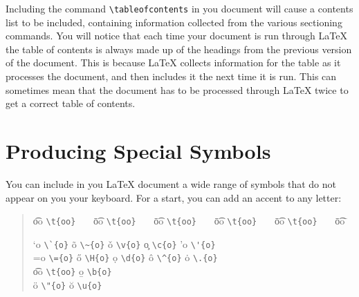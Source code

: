 Including the command \verb|\tableofcontents| in you document will cause a
contents list to be included, containing information collected from the various
sectioning commands.  You will notice that each time your document is run
through \LaTeX{} the table of contents is always made up of the headings from
the previous version of the document.  This is because \LaTeX{} collects
information for the table as it processes the document, and then includes it
the next time it is run.  This can sometimes mean that the document has to be
processed through \LaTeX{} twice to get a correct table of contents.

\section{Producing Special Symbols}

You can include in you \LaTeX{} document a wide range of symbols that do not
appear on you your keyboard. For a start, you can add an accent to any letter:
\begin{quote}\begin{tabbing}

\t{oo} \= \verb|\t{oo}|~~~ \=
\t{oo} \= \verb|\t{oo}|~~~ \=
\t{oo} \= \verb|\t{oo}|~~~ \=
\t{oo} \= \verb|\t{oo}|~~~ \=
\t{oo} \= \verb|\t{oo}|~~~ \=
\t{oo} \=                       \kill

\a`{o} \> \verb|\`{o}|  \> \~{o}  \> \verb|\~{o}|  \> \v{o}  \> \verb|\v{o}| \>
\c{o}  \> \verb|\c{o}|  \> \a'{o} \> \verb|\'{o}|  \\
\a={o} \> \verb|\={o}|  \> \H{o}  \> \verb|\H{o}|  \> \d{o}  \> \verb|\d{o}| \>
\^{o}  \> \verb|\^{o}|  \> \.{o}  \> \verb|\.{o}|  \\
\t{oo} \> \verb|\t{oo}| \> \b{o}  \> \verb|\b{o}|  \\  \"{o} \> \verb|\"{o}| \>
\u{o}  \> \verb|\u{o}|  \\
\end{tabbing}\end{quote}

